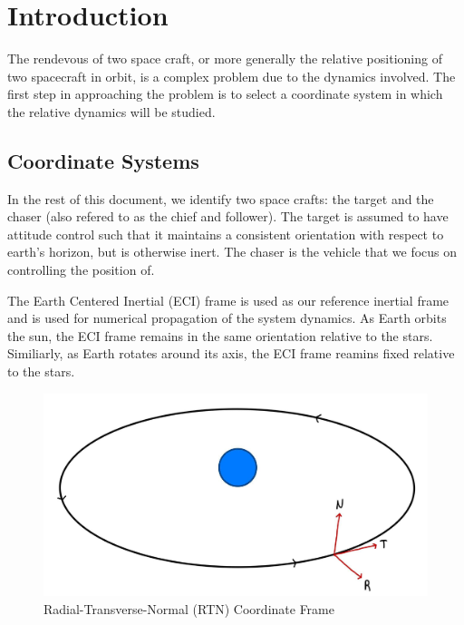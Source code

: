 \documentclass[conference]{IEEEtran}
\begin{document}

\section{Introduction}

The rendevous of two space craft, or more generally the relative positioning of
two spacecraft in orbit, is a complex problem due to the dynamics involved. The
first step in approaching the problem is to select a coordinate system in which
the relative dynamics will be studied.


\subsection{Coordinate Systems}

In the rest of this document, we
identify two space crafts: the target and the chaser (also refered to as the
chief and follower). The target is assumed to
have attitude control such that it maintains a consistent orientation with
respect to earth's horizon, but is otherwise inert. The chaser is the vehicle
that we focus on controlling the position of.

The Earth Centered Inertial (ECI) frame \cite{eci_frame} is used as our reference inertial frame
and is used for numerical propagation of the system dynamics. As Earth orbits
the sun, the ECI frame remains in the same orientation relative to the stars.
Similiarly, as Earth rotates around its axis, the ECI frame reamins fixed
relative to the stars.

\begin{figure}[htbp]
    \centerline{\includegraphics[width=\linewidth]{./figures/rtn-frame.jpg}}
    \caption{Radial-Transverse-Normal (RTN) Coordinate Frame}
    \label{fig:rtn-frame}
\end{figure}
\end{document}
